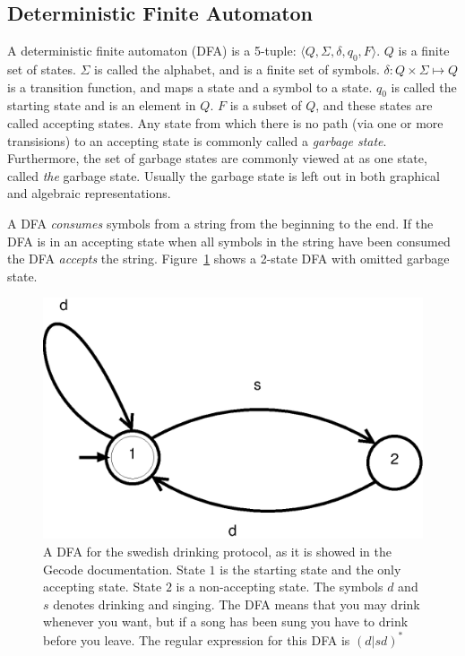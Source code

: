 \documentclass[a4paper,11pt]{article}
\begin{document}
\subsection{Deterministic Finite Automaton}
A deterministic finite automaton (DFA) is a 5-tuple: $\langle Q,\Sigma,\delta,q_0, F\rangle$. $Q$ is a finite set of states. $\Sigma$ is called the alphabet, and is a finite set of symbols. $\delta : Q \times \Sigma \mapsto Q$  is a transition function, and maps a state and a symbol to a state. $q_0$ is called the starting state and is an element in $Q$. $F$ is a subset of $Q$, and these states are called accepting states. Any state from which there is no path (via one or more transisions) to an accepting state is commonly called a \textit{garbage state}. Furthermore, the set of garbage states are commonly viewed at as one state, called \textit{the} garbage state. Usually the garbage state is left out in both graphical and algebraic representations. 

A DFA \textit{consumes} symbols from a string from the beginning to the end. If the DFA is in an accepting state when all symbols in the string have been consumed the DFA \textit{accepts} the string. Figure~\ref{fig:dfasdp} shows a 2-state DFA with omitted garbage state.

\begin{figure}[H]
\centering
\includegraphics[scale=0.6]{dfa.eps}
\caption{A DFA for the swedish drinking protocol, as it is showed in the Gecode documentation\cite{mpg}. State $1$ is the starting state and the only accepting state. State $2$ is a non-accepting state. The symbols $d$ and $s$ denotes drinking and singing. The DFA means that you may drink whenever you want, but if a song has been sung you have to drink before you leave. The regular expression for this DFA is $(d|sd)^{*}$}
\label{fig:dfasdp}
\end{figure}
\end{document}
